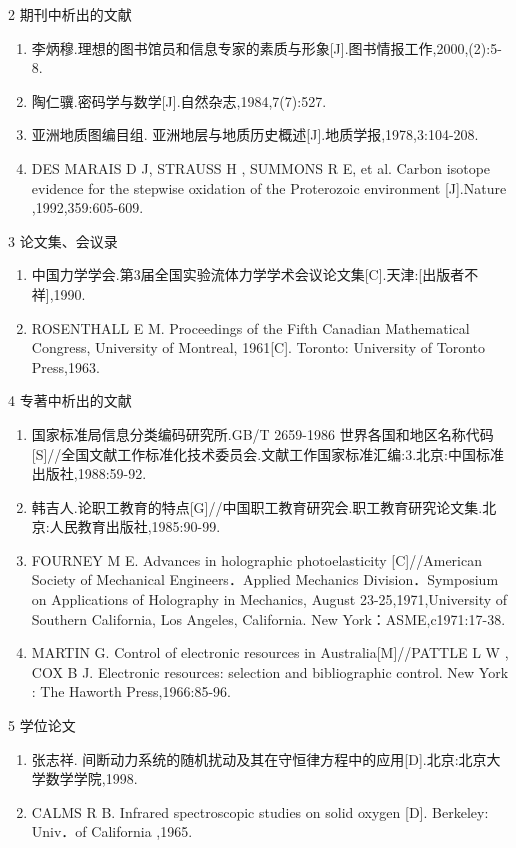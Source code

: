 2 期刊中析出的文献
\begin{enumerate}
\item 李炳穆.理想的图书馆员和信息专家的素质与形象[J].图书情报工作,2000,(2):5-8.
\item 陶仁骥.密码学与数学[J].自然杂志,1984,7(7):527.
\item 亚洲地质图编目组. 亚洲地层与地质历史概述[J].地质学报,1978,3:104-208. 
\item DES MARAIS D J, STRAUSS H , SUMMONS R E, et al. Carbon isotope evidence for the stepwise oxidation of the Proterozoic environment [J].Nature ,1992,359:605-609.
\end{enumerate}
\vspace{17.06pt}

3 论文集、会议录
\begin{enumerate}
\item 中国力学学会.第3届全国实验流体力学学术会议论文集[C].天津:[出版者不祥],1990.
\item  ROSENTHALL E M. Proceedings of the Fifth Canadian Mathematical Congress, University of Montreal, 1961[C]. Toronto: University of Toronto Press,1963.
\end{enumerate}
\vspace{17.06pt}

4 专著中析出的文献
\begin{enumerate}
\item 国家标准局信息分类编码研究所.GB/T 2659-1986 世界各国和地区名称代码[S]//全国文献工作标准化技术委员会.文献工作国家标准汇编:3.北京:中国标准出版社,1988:59-92.
\item 韩吉人.论职工教育的特点[G]//中国职工教育研究会.职工教育研究论文集.北京:人民教育出版社,1985:90-99.
\item FOURNEY M E. Advances in holographic photoelasticity [C]//American Society of Mechanical Engineers．Applied Mechanics Division．Symposium on Applications of Holography in Mechanics, August 23-25,1971,University of Southern California, Los Angeles, California. New York：ASME,c1971:17-38.
\item MARTIN G. Control of electronic resources in Australia[M]//PATTLE L W , COX B J. Electronic resources: selection and bibliographic control. New York : The Haworth Press,1966:85-96.
\end{enumerate}
\vspace{17.06pt}

5 学位论文
\begin{enumerate}
\item 张志祥. 间断动力系统的随机扰动及其在守恒律方程中的应用[D].北京:北京大学数学学院,1998.
\item CALMS R B. Infrared spectroscopic studies on solid oxygen [D]. Berkeley: Univ．of California ,1965.
\end{enumerate}
\vspace{17.06pt}

